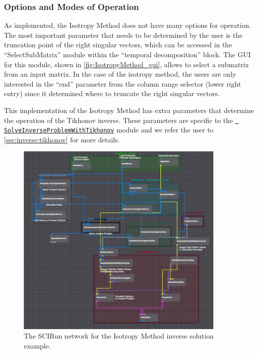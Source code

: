     \subsubsection{Options and Modes of Operation}

    As implemented, the Isotropy Method does not have many options for
    operation. The most important parameter that needs to be determined by
    the user is the truncation point of the right singular vectors, which
    can be accessed in the ``SelectSubMatrix'' module within the ``temporal
    decomposition'' block. The GUI for this module, shown in
    \autoref{fig:IsotropyMethod_gui}, allows to select a submatrix from an
    input matrix. In the case of the isotropy method, the users are only
    interested in the ``end'' parameter from the column range selector
    (lower right entry) since it determined where to truncate the right
    singular vectors.

    This implementation of the Isotropy Method has extra parameters that
    determine the operation of the Tikhonov inverse. These parameters are
    specific to the
    \href{http://scirundocwiki.sci.utah.edu/SCIRunDocs/index.php/CIBC:Documentation:SCIRun:Reference:BioPSE:SolveInverseProblemWithTikhonov}{{\tt
    SolveInverseProblemWithTikhonov}} module and we refer the user to
    \autoref{sec:inverse:tikhonov} for more details.

   \begin{figure}
       \begin{center}
       \includegraphics[width=0.9\textwidth]{ECGToolkitGuide_figures/IsotropyMethod_networkExample.png}
       \caption{The SCIRun network for the Isotropy Method inverse solution example.}
       \label{fig:IsotropyMethod}
       \end{center}
   \end{figure}


